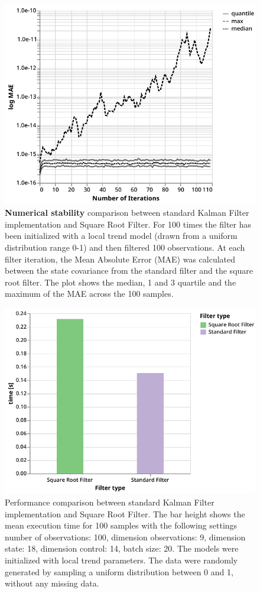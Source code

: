 \documentclass{article}
\begin{document}
\begin{figure}[H]
\includegraphics[width=\textwidth]{numerical_stability}
 \caption{\textbf{Numerical stability} comparison between standard Kalman Filter implementation and Square Root Filter. For 100 times the filter has been initialized with a local trend model (drawn from a uniform distribution range 0-1) and then filtered 100 observations. At each filter iteration, the Mean Absolute Error (MAE) was calculated between the state covariance from the standard filter and the square root filter. The plot shows the median, 1 and 3 quartile and the maximum of the MAE across the 100 samples.}
 \label{fig:num_stab}
\end{figure}

\begin{figure}
\includegraphics[width=\textwidth]{perf_sr}
 \caption{Performance comparison between standard Kalman Filter implementation and Square Root Filter. The bar height shows the mean execution time for 100 samples with the following settings number of observations: 100, dimension observations: 9, dimension state: 18, dimension control: 14, batch size: 20. The models were initialized with local trend parameters. The data were randomly generated by sampling a uniform distribution between 0 and 1, without any missing data.}
 \label{fig:num_stab_perf}
\end{figure}
\end{document}
